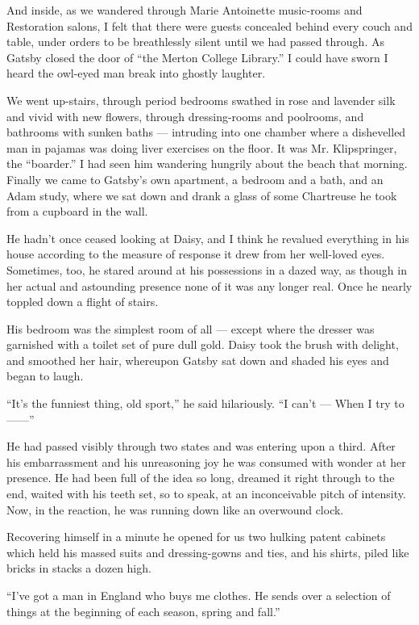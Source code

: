 \documentclass{znotebook}
\begin{document}
And inside, as we wandered through Marie Antoinette music-rooms and Restoration salons, I felt that there were guests concealed behind every couch and table, under orders to be breathlessly silent until we had passed through. As Gatsby closed the door of ``the Merton College Library.'' I could have sworn I heard the owl-eyed man break into ghostly laughter.

We went up-stairs, through period bedrooms swathed in rose and lavender silk and vivid with new flowers, through dressing-rooms and poolrooms, and bathrooms with sunken baths — intruding into one chamber where a dishevelled man in pajamas was doing liver exercises on the floor. It was Mr. Klipspringer, the ``boarder.'' I had seen him wandering hungrily about the beach that morning. Finally we came to Gatsby’s own apartment, a bedroom and a bath, and an Adam study, where we sat down and drank a glass of some Chartreuse he took from a cupboard in the wall.

He hadn’t once ceased looking at Daisy, and I think he revalued everything in his house according to the measure of response it drew from her well-loved eyes. Sometimes, too, he stared around at his possessions in a dazed way, as though in her actual and astounding presence none of it was any longer real. Once he nearly toppled down a flight of stairs.

His bedroom was the simplest room of all — except where the dresser was garnished with a toilet set of pure dull gold. Daisy took the brush with delight, and smoothed her hair, whereupon Gatsby sat down and shaded his eyes and began to laugh.

``It’s the funniest thing, old sport,'' he said hilariously. ``I can’t — When I try to ——''

He had passed visibly through two states and was entering upon a third. After his embarrassment and his unreasoning joy he was consumed with wonder at her presence. He had been full of the idea so long, dreamed it right through to the end, waited with his teeth set, so to speak, at an inconceivable pitch of intensity. Now, in the reaction, he was running down like an overwound clock.

Recovering himself in a minute he opened for us two hulking patent cabinets which held his massed suits and dressing-gowns and ties, and his shirts, piled like bricks in stacks a dozen high.

``I’ve got a man in England who buys me clothes. He sends over a selection of things at the beginning of each season, spring and fall.''
\end{document}
